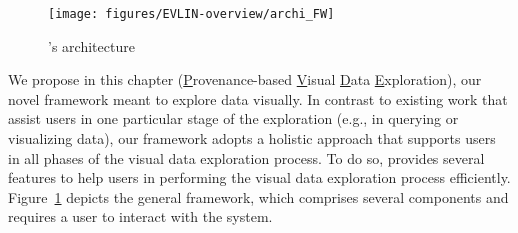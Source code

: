 \begin{figure}[b]
\centering
\texttt{[image: figures/EVLIN-overview/archi\_FW]}
\caption{\framework{}'s architecture}
\label{fig:archi-FW}
\end{figure}

We propose in this chapter \framework{} (\underline{P}rovenance-based \underline{V}isual \underline{D}ata \underline{E}xploration), our novel framework meant to explore data visually.
In contrast to existing work that assist users in one particular stage of the exploration (e.g., in querying or visualizing data), our framework \framework{} adopts a holistic approach that supports users in all phases of the visual data exploration process. To do so, \framework{} provides several features to help users in performing the visual data exploration process efficiently. 
Figure~\ref{fig:archi-FW} depicts the general framework, which comprises several components and requires a user to interact with the system. 

